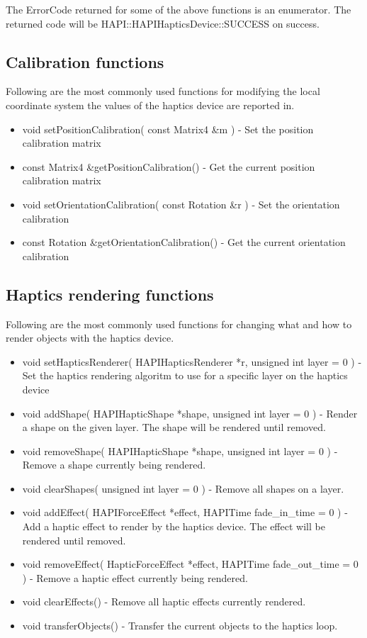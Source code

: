 The ErrorCode returned for some of the above functions is an enumerator. The
returned code will be HAPI::HAPIHapticsDevice::SUCCESS on success.

\subsection{Calibration functions}
Following are the most commonly used functions for modifying the local
coordinate system the values of the haptics device are reported in.

\begin{itemize}
\item void setPositionCalibration( const Matrix4 \&m ) - Set the
 position calibration matrix
\item const Matrix4 \&getPositionCalibration() - Get the current
 position calibration matrix
\item void setOrientationCalibration( const Rotation \&r ) - Set the
  orientation calibration
\item const Rotation \&getOrientationCalibration() - Get the
  current orientation calibration
\end{itemize}


\subsection{Haptics rendering functions}
\label{ssHapticsRenderingFunctions}
Following are the most commonly used functions for changing what and
how to render objects with the haptics device. 

\begin{itemize} 

\item void setHapticsRenderer( HAPIHapticsRenderer *r, unsigned int
  layer = 0 ) - Set the haptics rendering algoritm to use for a
  specific layer on the haptics device

\item void addShape( HAPIHapticShape *shape, unsigned int layer = 0 )
  - Render a shape on the given layer. The shape will be rendered
  until removed.
\item void removeShape( HAPIHapticShape *shape, unsigned int layer = 0
  ) - Remove a shape currently being rendered.
\item void clearShapes( unsigned int layer = 0 ) - Remove all shapes
  on a layer. 

\item void addEffect( HAPIForceEffect *effect, HAPITime fade\_in\_time = 0 ) - Add a haptic
  effect to render by the haptics device. The effect will be rendered
  until removed.
\item void removeEffect( HapticForceEffect *effect, HAPITime fade\_out\_time = 0 ) - Remove a haptic
  effect currently being rendered.
\item void clearEffects() - Remove all haptic effects currently rendered.
\item void transferObjects() - Transfer the current objects to the haptics loop.
\end{itemize}

